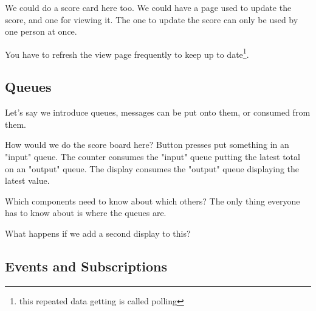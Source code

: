 \documentclass{article}
\begin{document}
We could do a score card here too.
We could have a page used to update the score, and one for viewing it.
The one to update the score can only be used by one person at once.

You have to refresh the view page frequently to keep up to date\footnote{
this repeated data getting is called polling}.

\subsection{Queues}
Let's say we introduce queues, messages can be put onto them, or consumed from them.

How would we do the score board here?
Button presses put something in an "input" queue.
The counter consumes the "input" queue putting the latest total on an "output" queue.
The display consumes the "output" queue displaying the latest value.

Which components need to know about which others?
The only thing everyone has to know about is where the queues are.

What happens if we add a second display to this?

\subsection{Events and Subscriptions}
\end{document}
